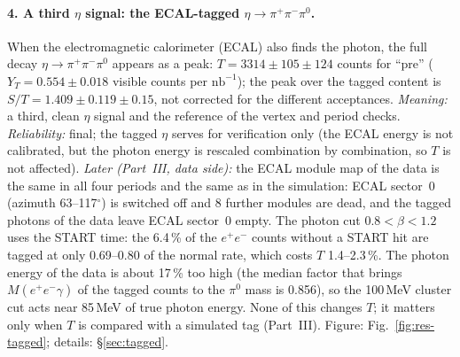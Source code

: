 \documentclass[11pt,a4paper]{article}
\newcommand{\piz}{\ensuremath{\pi^{0}}\xspace}
\newcommand{\ee}{\ensuremath{e^{+}e^{-}}\xspace}
\newcommand{\pipi}{\ensuremath{\pi^{+}\pi^{-}}\xspace}
\newcommand{\nbinv}{\ensuremath{\mathrm{nb}^{-1}}\xspace}
\begin{document}
\paragraph{4. A third $\eta$ signal: the ECAL-tagged $\eta\to\pipi\piz$.} When the electromagnetic calorimeter (ECAL) also finds the photon, the full
decay $\eta\to\pipi\piz$ appears as a peak: $T=3314\pm105\pm124$ counts for ``pre'' ($Y_T=0.554\pm0.018$ visible counts per \nbinv); the
peak over the tagged content is $S/T=1.409\pm0.119\pm0.15$, not corrected for the different acceptances. \emph{Meaning:} a third,
clean $\eta$ signal and the reference of the vertex and period checks. \emph{Reliability:} final; the tagged $\eta$ serves for
verification only (the ECAL energy is not calibrated, but the photon energy is rescaled combination by combination, so $T$ is not affected). \emph{Later
(Part~III, data side):} the ECAL module map of the data is the same in all four periods and the same as in the simulation: ECAL
sector~0 (azimuth 63--117$^\circ$) is switched off and 8 further modules are dead, and the tagged photons of the data leave ECAL sector~0
empty. The photon cut $0.8<\beta<1.2$ uses the START time: the 6.4\,\% of the \ee counts without a START hit are tagged at only 0.69--0.80 of
the normal rate, which costs $T$ 1.4--2.3\,\%. The photon energy of the data is about 17\,\% too high (the median factor that brings
$M(\ee\gamma)$ of the tagged counts to the \piz mass is 0.856), so the 100\,MeV cluster cut acts near 85\,MeV of true photon energy. None of this changes $T$; it matters only when $T$ is compared with a simulated tag (Part~III).
Figure: Fig.~\ref{fig:res-tagged}; details: \S\ref{sec:tagged}.
\end{document}
